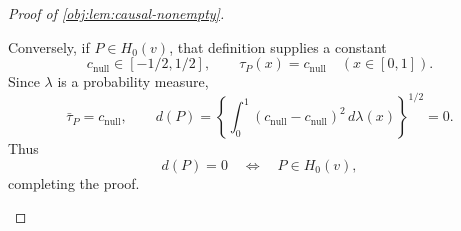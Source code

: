 \begin{proof}[Proof of \cref{obj:lem:causal-nonempty}]
\begin{enumerate}
Conversely, if \(P\in H_0(v)\), that definition supplies a constant
\[
c_{\mathrm{null}}\in[-1/2,1/2],
\qquad
\tau_P(x)=c_{\mathrm{null}}
\quad(x\in[0,1]).
\]
Since \(\lambda\) is a probability measure,
\[
\bar\tau_P=c_{\mathrm{null}},
\qquad
d(P)
=\left\{\int_0^1(c_{\mathrm{null}}-c_{\mathrm{null}})^2
\,d\lambda(x)\right\}^{1/2}
=0.
\]
Thus
\[
d(P)=0\quad\Longleftrightarrow\quad P\in H_0(v),
\]
completing the proof.
\end{enumerate}
\end{proof}
